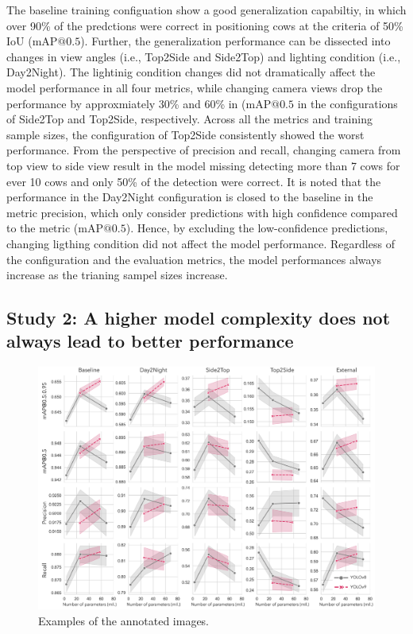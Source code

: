 The baseline training configuation show a good generalization capabiltiy, in which over 90\% of the predctions were correct in positioning cows at the criteria of 50\% IoU ($\text{mAP@{0.5}}$). Further, the generalization performance can be dissected into changes in view angles (i.e., Top2Side and Side2Top) and lighting condition (i.e., Day2Night). The lightinig condition changes did not dramatically affect the model performance in all four metrics, while changing camera views drop the performance by approxmiately 30\% and 60\% in ($\text{mAP@{0.5}}$ in the configurations of Side2Top and Top2Side, respectively. Across all the metrics and training sample sizes, the configuration of Top2Side consistently showed the worst performance. From the perspective of precision and recall, changing camera from top view to side view result in the model missing detecting more than 7 cows for ever 10 cows and only 50\% of the detection were correct. It is noted that the performance in the Day2Night configuration is closed to the baseline in the metric precision, which only consider predictions with high confidence compared to the metric ($\text{mAP@{0.5}}$). Hence, by excluding the low-confidence predictions, changing ligthing condition did not affect the model performance. Regardless of the configuration and the evaluation metrics, the model performances always increase as the trianing sampel sizes increase.


\subsection*{Study 2: A higher model complexity does not always lead to better performance}


\begin{figure}[H]
    \centering
    \includegraphics[width=1\textwidth]{figure_4.jpg}
    \caption{Examples of the annotated images.}
    \label{fig:models}
\end{figure}


